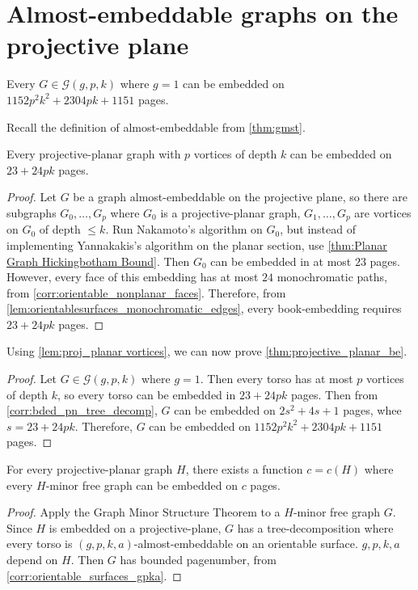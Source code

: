 
\section{Almost-embeddable graphs on the projective plane}

\begin{theorem}\label{thm:projective_planar_be}
	Every $G \in \mathcal{G}(g, p, k)$ where $g = 1$ can be embedded on $1152p^2 k^2 + 2304 pk + 1151$ pages.
\end{theorem}
Recall the definition of almost-embeddable from \cref{thm:gmst}. 
\begin{lemma}\label{lem:proj_planar vortices}
	Every projective-planar graph with $p$ vortices of depth $k$ can be embedded on $23 + 24pk$ pages.
\end{lemma}
\begin{proof}
	Let $G$ be a graph almost-embeddable on the projective plane, so there are subgraphs $G_0, \ldots, G_p$ where $G_0$ is a projective-planar graph, $G_1, \ldots, G_p$ are vortices on $G_0$ of depth $\leq k$. 
	Run Nakamoto's algorithm on $G_0$, but instead of implementing Yannakakis's algorithm on the planar section, use \cref{thm:Planar Graph Hickingbotham Bound}. Then $G_0$ can be embedded in at most $23$ pages. However, every face of this embedding has at most $24$ monochromatic paths, from \cref{corr:orientable_nonplanar_faces}. Therefore, from \cref{lem:orientablesurfaces_monochromatic_edges}, every book-embedding requires $23 + 24pk$ pages.
\end{proof}

Using \cref{lem:proj_planar vortices}, we can now prove \cref{thm:projective_planar_be}.
\begin{proof}
	Let $G \in \mathcal{G}(g, p, k)$ where $g = 1$. Then every torso has at most $p$ vortices of depth $k$, so every torso can be embedded in $23 + 24 pk$ pages. Then from \cref{corr:bded_pn_tree_decomp}, $G$ can be embedded on $2s^2 + 4s + 1$ pages, whee $s = 23 + 24pk$. Therefore, $G$ can be embedded on $1152p^2 k^2 + 2304 pk + 1151$ pages.
\end{proof}

\begin{proposition}
	For every projective-planar graph $H$, there exists a function $c = c(H)$ where every $H$-minor free graph can be embedded on $c$ pages. 
\end{proposition}
\begin{proof}
	Apply the Graph Minor Structure Theorem to a $H$-minor free graph $G$. Since $H$ is embedded on a projective-plane, $G$ has a tree-decomposition where every torso is $(g,p,k,a)$-almost-embeddable on an orientable surface. $g, p, k,a$ depend on $H$. Then $G$ has bounded pagenumber, from \cref{corr:orientable_surfaces_gpka}.
\end{proof}

